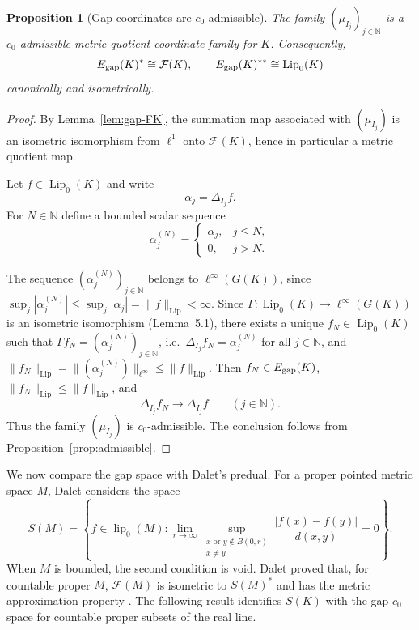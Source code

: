 \documentclass[11pt]{amsart}
\theoremstyle{plain}
\newtheorem{proposition}[theorem]{Proposition}
\theoremstyle{definition}
\theoremstyle{remark}
\newcommand{\Lip}{\operatorname{Lip}}
\newcommand{\lip}{\operatorname{lip}}
\newcommand{\F}{\mathcal F}
\newcommand{\N}{\mathbb N}
\begin{document}
\begin{proposition}[Gap coordinates are $c_0$-admissible]
\label{prop:gap-admissible}
The family $(\mu_{I_j})_{j\in\N}$ is a $c_0$-admissible metric quotient
coordinate family for $K$. Consequently,
\[
        E_{\rm gap}(K)^*\cong \F(K),
        \qquad
        E_{\rm gap}(K)^{**}\cong \Lip_0(K)
\]
canonically and isometrically.
\end{proposition}

\begin{proof}
By Lemma~\ref{lem:gap-FK}, the summation map associated with
$(\mu_{I_j})$ is an isometric isomorphism from $\ell^1$ onto $\F(K)$, hence
in particular a metric quotient map.

Let $f\in\Lip_0(K)$ and write
\[
        \alpha_j=\Delta_{I_j}f.
\]
For $N\in\N$ define a bounded scalar sequence
\[
        \alpha^{(N)}_j=
        \begin{cases}
        \alpha_j,& j\le N,\\
        0,& j>N.
        \end{cases}
\]



The sequence $(\alpha^{(N)}_j)_{j\in\mathbb{N}}$ belongs to $\ell^\infty(G(K))$,
since $\sup_j|\alpha^{(N)}_j|\le\sup_j|\alpha_j|=\|f\|_{\mathrm{Lip}}<\infty$.
Since $\Gamma\colon \Lip_0(K)\to\ell^\infty(G(K))$ is an isometric isomorphism
(Lemma~5.1), there exists a unique $f_N\in\Lip_0(K)$ such that
$\Gamma f_N = (\alpha^{(N)}_j)_{j\in\mathbb{N}}$, i.e.\
$\Delta_{I_j}f_N = \alpha^{(N)}_j$ for all $j\in\mathbb{N}$,
and $\|f_N\|_{\mathrm{Lip}} = \|(\alpha^{(N)}_j)\|_{\ell^\infty} \le \|f\|_{\mathrm{Lip}}$.
Then $f_N\in E_{\rm gap}(K)$, $\|f_N\|_{\Lip}\le\|f\|_{\Lip}$, and
\[
        \Delta_{I_j}f_N\longrightarrow \Delta_{I_j}f
        \qquad(j\in\N).
\]
Thus the family $(\mu_{I_j})$ is $c_0$-admissible. The conclusion follows
from Proposition~\ref{prop:admissible}.
\end{proof}

We now compare the gap space with Dalet's predual. For a proper pointed
metric space $M$, Dalet considers the space
\[
        S(M)=\left\{ f\in\lip_0(M):
        \lim_{r\to\infty}
        \sup_{\substack{x\text{ or }y\notin B(0,r)\\ x\ne y}}
        \frac{|f(x)-f(y)|}{d(x,y)}=0
        \right\}.
\]
When $M$ is bounded, the second condition is void. Dalet proved that, for
countable proper $M$, $\F(M)$ is isometric to $S(M)^*$ and has the metric
approximation property \cite{Dal15b}. The following result identifies
$S(K)$ with the gap $c_0$-space for countable proper subsets of the real
line.
\end{document}
